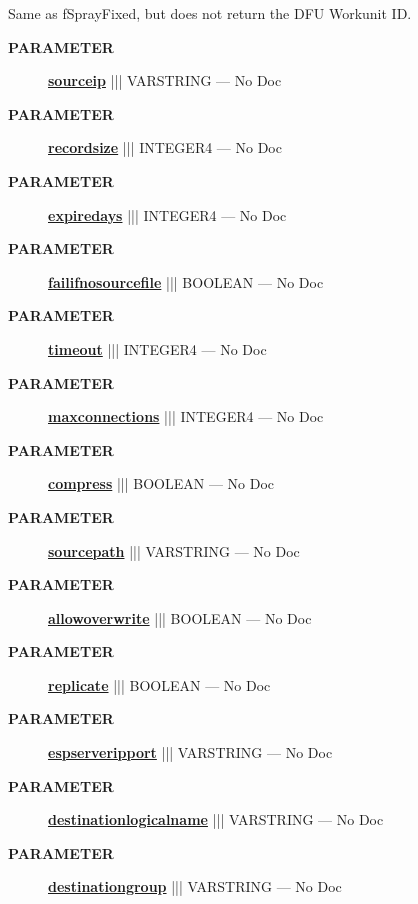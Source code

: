 \par





Same as fSprayFixed, but does not return the DFU Workunit ID.






\par
\begin{description}
\item [\colorbox{tagtype}{\color{white} \textbf{\textsf{PARAMETER}}}] \textbf{\underline{sourceip}} ||| VARSTRING --- No Doc
\item [\colorbox{tagtype}{\color{white} \textbf{\textsf{PARAMETER}}}] \textbf{\underline{recordsize}} ||| INTEGER4 --- No Doc
\item [\colorbox{tagtype}{\color{white} \textbf{\textsf{PARAMETER}}}] \textbf{\underline{expiredays}} ||| INTEGER4 --- No Doc
\item [\colorbox{tagtype}{\color{white} \textbf{\textsf{PARAMETER}}}] \textbf{\underline{failifnosourcefile}} ||| BOOLEAN --- No Doc
\item [\colorbox{tagtype}{\color{white} \textbf{\textsf{PARAMETER}}}] \textbf{\underline{timeout}} ||| INTEGER4 --- No Doc
\item [\colorbox{tagtype}{\color{white} \textbf{\textsf{PARAMETER}}}] \textbf{\underline{maxconnections}} ||| INTEGER4 --- No Doc
\item [\colorbox{tagtype}{\color{white} \textbf{\textsf{PARAMETER}}}] \textbf{\underline{compress}} ||| BOOLEAN --- No Doc
\item [\colorbox{tagtype}{\color{white} \textbf{\textsf{PARAMETER}}}] \textbf{\underline{sourcepath}} ||| VARSTRING --- No Doc
\item [\colorbox{tagtype}{\color{white} \textbf{\textsf{PARAMETER}}}] \textbf{\underline{allowoverwrite}} ||| BOOLEAN --- No Doc
\item [\colorbox{tagtype}{\color{white} \textbf{\textsf{PARAMETER}}}] \textbf{\underline{replicate}} ||| BOOLEAN --- No Doc
\item [\colorbox{tagtype}{\color{white} \textbf{\textsf{PARAMETER}}}] \textbf{\underline{espserveripport}} ||| VARSTRING --- No Doc
\item [\colorbox{tagtype}{\color{white} \textbf{\textsf{PARAMETER}}}] \textbf{\underline{destinationlogicalname}} ||| VARSTRING --- No Doc
\item [\colorbox{tagtype}{\color{white} \textbf{\textsf{PARAMETER}}}] \textbf{\underline{destinationgroup}} ||| VARSTRING --- No Doc
\end{description}







